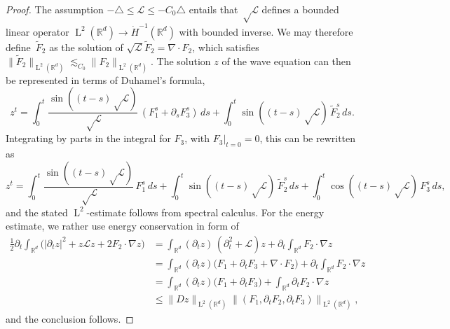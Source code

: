 \documentclass[JEP,XML,SOM,Unicode,published]{cedram}
\theoremstyle{plain}
\theoremstyle{definition}
\numberwithin{equation}{section}
\newcommand{\Lc}{\mathcal{L}}
\newcommand{\R}{\mathbb R}
\newcommand{\Ld}{\operatorname{L}}
\begin{document}
\begin{proof}
The assumption $-\triangle\le\Lc\le-C_0\triangle$ entails that $\sqrt\Lc$ defines a bounded linear operator $\Ld^2(\R^d)\to\dot H^{-1}(\R^d)$ with bounded inverse. We may therefore define~$\tilde F_2$ as the solution of $\sqrt{\Lc} \tilde F_2=\nabla\cdot F_2$, which satisfies $\|\tilde F_2\|_{\Ld^2(\R^d)}\lesssim_{C_0}\|F_2\|_{\Ld^2(\R^d)}$.
The solution $z$ of the wave equation can then be represented in terms of Duhamel's formula,
\[z^t=\int_0^t\frac{\sin((t-s)\sqrt\Lc)}{\sqrt\Lc}\,(F_1^s+\partial_s F_3^s)\,ds+\int_0^t\sin((t-s)\sqrt\Lc)\,\tilde F_2^s\,ds.\]
Integrating by parts in the integral for $F_3$, with $F_3|_{t=0}=0$, this can be rewritten as
\[z^t=\int_0^t\frac{\sin((t-s)\sqrt\Lc)}{\sqrt\Lc}\,F_1^s\,ds+\int_0^t\sin((t-s)\sqrt\Lc)\,\tilde F_2^s\,ds+\int_0^t\cos((t-s)\sqrt\Lc)\,F_3^s\,ds,\]
and the stated $\Ld^2$-estimate follows from spectral calculus.
For the energy estimate, we rather use energy conservation in form of
\begin{align*}
\tfrac12\partial_t\int_{\R^d}\big(|\partial_tz|^2+z\Lc z+2F_2\cdot\nabla z\big)
&=\int_{\R^d} (\partial_tz)\,(\partial^2_t+\Lc)z+\partial_t\int_{\R^d}F_2\cdot\nabla z\\
&=\int_{\R^d}(\partial_tz)\big(F_1+\partial_tF_3+\nabla\cdot F_2\big)+\partial_t\int_{\R^d}F_2\cdot\nabla z\\
&=\int_{\R^d}(\partial_tz)\big(F_1+\partial_tF_3\big)+\int_{\R^d}\partial_tF_2\cdot\nabla z\\
&\le\|Dz\|_{\Ld^2(\R^d)}\|(F_1,\partial_tF_2,\partial_t F_3)\|_{\Ld^2(\R^d)},
\end{align*}
and the conclusion follows.
\end{proof}

\backmatter


\end{document}
